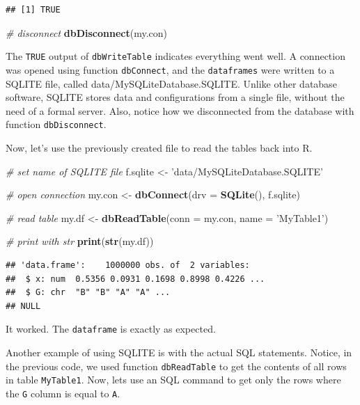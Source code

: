 \documentclass[11pt,]{book}
\newenvironment{Shaded}{\begin{snugshade}}{\end{snugshade}}
\newcommand{\KeywordTok}[1]{\textcolor[rgb]{0.27,0.27,0.27}{\textbf{#1}}}
\newcommand{\DataTypeTok}[1]{\textcolor[rgb]{0.27,0.27,0.27}{#1}}
\newcommand{\StringTok}[1]{\textcolor[rgb]{0.5,0.5,0.5}{#1}}
\newcommand{\CommentTok}[1]{\textcolor[rgb]{0.56,0.35,0.01}{\textit{#1}}}
\newcommand{\NormalTok}[1]{#1}
\begin{document}
\begin{verbatim}
## [1] TRUE
\end{verbatim}

\begin{Shaded}
\begin{Highlighting}[]
\CommentTok{# disconnect}
\KeywordTok{dbDisconnect}\NormalTok{(my.con)}
\end{Highlighting}
\end{Shaded}

The \texttt{TRUE} output of \texttt{dbWriteTable} indicates everything
went well. A connection was opened using function \texttt{dbConnect},
and the \texttt{dataframes} were written to a SQLITE file, called
data/MySQLiteDatabase.SQLITE. Unlike other database software, SQLITE
stores data and configurations from a single file, without the need of a
formal server. Also, notice how we disconnected from the database with
function \texttt{dbDisconnect}. 
 

Now, let's use the previously created file to read the tables back into
R.

\begin{Shaded}
\begin{Highlighting}[]
\CommentTok{# set name of SQLITE file}
\NormalTok{f.sqlite <-}\StringTok{ 'data/MySQLiteDatabase.SQLITE'}

\CommentTok{# open connection}
\NormalTok{my.con <-}\StringTok{ }\KeywordTok{dbConnect}\NormalTok{(}\DataTypeTok{drv =} \KeywordTok{SQLite}\NormalTok{(), f.sqlite)}

\CommentTok{# read table}
\NormalTok{my.df <-}\StringTok{ }\KeywordTok{dbReadTable}\NormalTok{(}\DataTypeTok{conn =}\NormalTok{ my.con, }\DataTypeTok{name =} \StringTok{'MyTable1'}\NormalTok{)}

\CommentTok{# print with str}
\KeywordTok{print}\NormalTok{(}\KeywordTok{str}\NormalTok{(my.df))}
\end{Highlighting}
\end{Shaded}

\begin{verbatim}
## 'data.frame':    1000000 obs. of  2 variables:
##  $ x: num  0.5356 0.0931 0.1698 0.8998 0.4226 ...
##  $ G: chr  "B" "B" "A" "A" ...
## NULL
\end{verbatim}

It worked. The \texttt{dataframe} is exactly as expected.

Another example of using SQLITE is with the actual SQL statements.
Notice, in the previous code, we used function \texttt{dbReadTable} to
get the contents of all rows in table \texttt{MyTable1}. Now, lets use
an SQL command to get only the rows where the \texttt{G} column is equal
to \texttt{A}.
\end{document}
